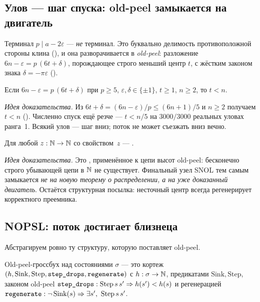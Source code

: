 \subsection{Улов --- шаг спуска: old-peel замыкается на двигатель}

Терминал $p\mid a-2\varepsilon$ --- \emph{не} терминал. Это буквально делимость противоположной
стороны клина (), и она разворачивается в \emph{old-peel}: разложение
$6n-\varepsilon=p\,(6t+\delta)$, порождающее строго меньший центр $t$, с жёстким законом знака
$\delta=-\pi\varepsilon$ ().

\begin{theorem}\label{thm:old_peel_height_drop}
Если $6n-\varepsilon=p\,(6t+\delta)$ при $p\ge5$, $\varepsilon,\delta\in\{\pm1\}$, $t\ge1$, $n\ge2$,
то $t<n$.
\end{theorem}

\emph{Идея доказательства.} Из $6t+\delta=(6n-\varepsilon)/p\le(6n+1)/5$ и $n\ge2$ получаем $t<n$
(). \green{} Численно спуск ещё резче --- $t<n/5$ на $3000/3000$ реальных уловах
ранга~1. Всякий улов --- шаг вниз; поток не может съезжать вниз вечно.

\begin{theorem}\label{thm:no_infinite_old_peel}
Для любой $z:\mathbb{N}\to\mathbb{N}$ со свойством \,$z$ --- .
\end{theorem}

\emph{Идея доказательства.} Это , применённое к цепи высот
old-peel: бесконечно строго убывающей цепи в $\mathbb{N}$ не существует. \green{} Финальный узел SNOL тем
самым замыкается \emph{не на новую теорему о распределении, а на уже доказанный двигатель}. Остаётся
структурная посылка: несточный центр всегда регенерирует корректного преемника.

\subsection{NOPSL: поток достигает близнеца}

Абстрагируем ровно ту структуру, которую поставляет old-peel.

\begin{definition}\label{def:oldpeelledger}
Old-peel-гроссбух над состояниями $\sigma$ --- это кортеж $(h,\mathrm{Sink},\mathrm{Step},
\texttt{step\_drops},\texttt{regenerate})$ с $h:\sigma\to\mathbb{N}$, предикатами
$\mathrm{Sink},\mathrm{Step}$, законом old-peel
$\texttt{step\_drops}:\mathrm{Step}\,s\,s'\Rightarrow h(s')<h(s)$ и регенерацией
$\texttt{regenerate}:\neg\,\mathrm{Sink}(s)\Rightarrow\exists s',\ \mathrm{Step}\,s\,s'$.
\end{definition}


